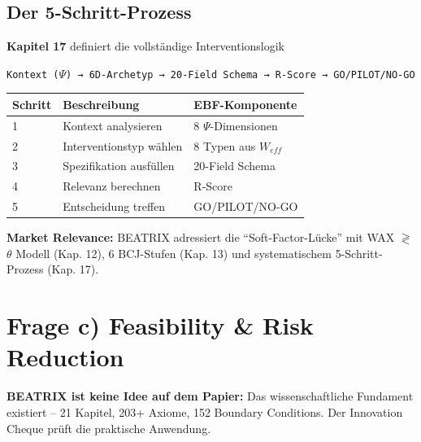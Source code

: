 \documentclass[11pt,a4paper]{article}
\begin{document}
\subsection{Der 5-Schritt-Prozess}

\begin{ebfbox}
\textbf{Kapitel 17} definiert die vollständige Interventionslogik
\end{ebfbox}

\begin{center}
\texttt{Kontext ($\Psi$) → 6D-Archetyp → 20-Field Schema → R-Score → GO/PILOT/NO-GO}
\end{center}

\begin{center}
\begin{tabular}{lll}
\toprule
\textbf{Schritt} & \textbf{Beschreibung} & \textbf{EBF-Komponente} \\
\midrule
1 & Kontext analysieren & 8 $\Psi$-Dimensionen \\
2 & Interventionstyp wählen & 8 Typen aus $W_{eff}$ \\
3 & Spezifikation ausfüllen & 20-Field Schema \\
4 & Relevanz berechnen & R-Score \\
5 & Entscheidung treffen & GO/PILOT/NO-GO \\
\bottomrule
\end{tabular}
\end{center}

\begin{summarybox}
\textbf{Market Relevance:} BEATRIX adressiert die ``Soft-Factor-Lücke'' mit WAX $\gtrless$ $\theta$ Modell (Kap. 12), 6 BCJ-Stufen (Kap. 13) und systematischem 5-Schritt-Prozess (Kap. 17).
\end{summarybox}

\newpage


\section{Frage c) Feasibility \& Risk Reduction}

\begin{keyinsight}
\textbf{BEATRIX ist keine Idee auf dem Papier:} Das wissenschaftliche Fundament existiert -- 21 Kapitel, 203+ Axiome, 152 Boundary Conditions. Der Innovation Cheque prüft die praktische Anwendung.
\end{keyinsight}
\end{document}
